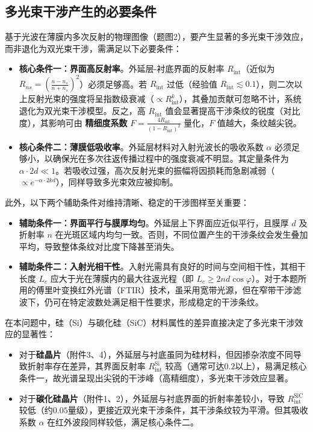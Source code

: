 \documentclass[withoutpreface,bwprint]{cumcmthesis} %
\begin{document}
\subsection{多光束干涉产生的必要条件}
基于光波在薄膜内多次反射的物理图像（题图2），要产生显著的多光束干涉效应，而非退化为双光束干涉，需满足以下必要条件：

\begin{itemize}
    \item \textbf{核心条件一：界面高反射率}。外延层-衬底界面的反射率 $R_{\text{int}}$（近似为 $R_{ns} = \left( \frac{n - n_s}{n + n_s} \right)^2$）必须足够高。若 $R_{\text{int}}$ 过低（经验值 $R_{\text{int}} \lesssim 0.1$），则二次以上反射光束的强度将呈指数级衰减（$\propto R_{\text{int}}^k$），其叠加贡献可忽略不计，系统退化为双光束干涉模型。反之，高 $R_{\text{int}}$ 值会显著提高干涉条纹的锐度（对比度），其影响可由 \textbf{精细度系数} $F = \frac{4R_{\text{int}}}{(1-R_{\text{int}})^2}$ 量化，$F$ 值越大，条纹越尖锐。

    \item \textbf{核心条件二：薄膜低吸收率}。外延层材料对入射光波长的吸收系数 $\alpha$ 必须足够小，以确保光在多次往返传播过程中的强度衰减不明显。其定量条件为 $\alpha \cdot 2d \ll 1$。若吸收过强，高次反射光束的振幅将因损耗而急剧减弱（$\propto e^{-\alpha \cdot 2k d}$），同样导致多光束效应被抑制。
\end{itemize}

\noindent 此外，以下两个辅助条件对维持清晰、稳定的干涉图样至关重要：

\begin{itemize}
    \item \textbf{辅助条件一：界面平行与膜厚均匀}。外延层上下界面应近似平行，且膜厚 $d$ 及折射率 $n$ 在光斑区域内均匀一致。否则，不同位置产生的干涉条纹会发生叠加平均，导致整体条纹对比度下降甚至消失。

    \item \textbf{辅助条件二：入射光相干性}。入射光需具有良好的时间与空间相干性，其相干长度 $L_c$ 应大于光在薄膜内的最大往返光程（即 $L_c \geq 2nd\cos\varphi$）。对于本题所用的傅里叶变换红外光谱（FTIR）技术，虽采用宽带光源，但在窄带干涉滤波下，仍可在特定波数处满足相干性要求，形成稳定的干涉条纹。
\end{itemize}

\noindent 在本问题中，硅（Si）与碳化硅（SiC）材料属性的差异直接决定了多光束干涉效应的显著性：
\begin{itemize}
    \item 对于\textbf{硅晶片}（附件3、4），外延层与衬底虽同为硅材料，但因掺杂浓度不同导致折射率存在差异，其界面反射率 $R_{\text{int}}^{\text{Si}}$ 较高（通常可达$0.2$以上），易满足核心条件一，故光谱呈现出尖锐的干涉峰（高精细度），多光束干涉效应显著。
    \item 对于\textbf{碳化硅晶片}（附件1、2），外延层与衬底界面的折射率差较小，导致 $R_{\text{int}}^{\text{SiC}}$ 较低（约$0.05$量级），更接近双光束干涉条件，其干涉条纹较为平滑。但其吸收系数 $\alpha$ 在红外波段同样较低，满足核心条件二。
\end{itemize}
\end{document}
